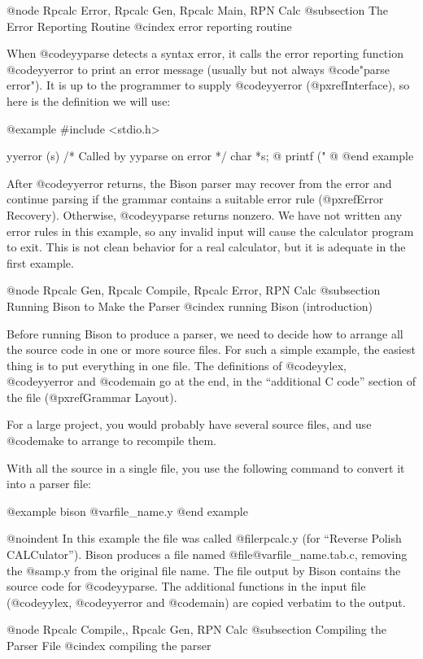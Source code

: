 {{{@node Rpcalc Error, Rpcalc Gen, Rpcalc Main, RPN Calc
@subsection The Error Reporting Routine
@cindex error reporting routine

When @code{yyparse} detects a syntax error, it calls the error reporting
function @code{yyerror} to print an error message (usually but not always
@code{"parse error"}).  It is up to the programmer to supply @code{yyerror}
(@pxref{Interface}), so here is the definition we will use:

@example
#include <stdio.h>

yyerror (s)  /* Called by yyparse on error */
     char *s;
@{
  printf ("%
@}
@end example

After @code{yyerror} returns, the Bison parser may recover from the error
and continue parsing if the grammar contains a suitable error rule
(@pxref{Error Recovery}).  Otherwise, @code{yyparse} returns nonzero.  We
have not written any error rules in this example, so any invalid input will
cause the calculator program to exit.  This is not clean behavior for a
real calculator, but it is adequate in the first example.

@node Rpcalc Gen, Rpcalc Compile, Rpcalc Error, RPN Calc
@subsection Running Bison to Make the Parser
@cindex running Bison (introduction)

Before running Bison to produce a parser, we need to decide how to arrange
all the source code in one or more source files.  For such a simple example,
the easiest thing is to put everything in one file.  The definitions of
@code{yylex}, @code{yyerror} and @code{main} go at the end, in the
``additional C code'' section of the file (@pxref{Grammar Layout}).

For a large project, you would probably have several source files, and use
@code{make} to arrange to recompile them.

With all the source in a single file, you use the following command to
convert it into a parser file:

@example
bison @var{file_name}.y
@end example

@noindent
In this example the file was called @file{rpcalc.y} (for ``Reverse Polish
CALCulator'').  Bison produces a file named @file{@var{file_name}.tab.c},
removing the @samp{.y} from the original file name. The file output by
Bison contains the source code for @code{yyparse}.  The additional
functions in the input file (@code{yylex}, @code{yyerror} and @code{main})
are copied verbatim to the output.

@node Rpcalc Compile,, Rpcalc Gen, RPN Calc
@subsection Compiling the Parser File
@cindex compiling the parser

}}}
